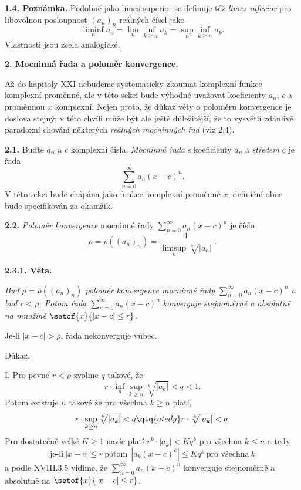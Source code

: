 \documentclass[12pt]{article}
\begin{document}
   \bigskip
   
   {\bf 1.4. Poznámka.} Podobně jako limes superior se definuje též
    {\em limes inferior}  pro libovolnou posloupnost $(a_n)_n$ reálných čísel jako
 $$
 \liminf_na_n= \lim_n\inf_{k\geq n}a_k=\sup_n\inf_{k\geq n}a_k.
 $$
Vlastnosti jsou zcela analogické.
 
 
 
 
 
   
   \vskip10mm
 
 {\large\bf 2. Mocninná řada a poloměr konvergence.}
 
 \bigskip
 
 Až do kapitoly XXI nebudeme systematicky zkoumat komplexní funkce komplexní proměnné, ale v této sekci bude výhodné uvažovat koeficienty
$a_n$, $c$  a proměnnou $x$ komplexní. Nejen proto, že důkaz věty o poloměru konvergence
je doslova stejný; v této chvíli může být ale ještě důležitější, že to vysvětlí zdánlivě paradoxní chování některých {\em reálných mocninných řad} (viz 2.4).
  
  \bigskip
 
 {\bf 2.1.} Buďte $a_n$ a $c$ komplexní čísla.  {\em Mocninná řada} s koeficienty $a_n$ a {\em středem} $c$ je řada
 $$
 \sum_{n=0}^\infty a_n(x-c)^n.
 $$
V této sekci bude chápána jako funkce komplexní proměnné $x$; definiční obor bude specifikován za okamžik.
 
 \bigskip
 
 {\bf 2.2.}  {\em Poloměr konvergence} mocninné řady $\sum_{n=0}^\infty a_n(x-c)^n$ je číslo
 $$
 \rho=\rho((a_n)_n)=\frac{1}{\limsup_n\sqrt[n]{|a_n|}}\ .
 $$
 
   \medskip
   
   {\bf 2.3.1. Věta.} {\em  Buď $\rho=\rho((a_n)_n)$ poloměr konvergence mocninné řady
	$\sum_{n=0}^\infty a_n(x-c)^n$ a buď $r<\rho$. Potom řada $\sum_{n=0}^\infty a_n(x-c)^n$ konverguje stejnoměrně a absolutně na množině
   $\setof{x}{|x-c|\leq r}$. 
   
   Je-li $|x-c|>\rho$, řada nekonverguje vůbec.
   
   Důkaz.} I. Pro pevné    $r<\rho$ zvolme $q$ takové, že
   $$
   r\cdot\inf_n \sup_{k\geq n}\sqrt[k]{|a_k|}<q<1.
   $$
   Potom existuje $n$ takové že pro všechna $k\geq n$ platí,
   $$
   r\cdot \sup_{k\geq n}\sqrt[k]{|a_k|}<q \qtq{a tedy} r\cdot\sqrt[k]{|a_k|}< q.
   $$
  Pro dostatečně velké $K\geq 1$ navíc platí $r^k\cdot|a_k|<Kq^k$ pro všechna $k\leq n$ a tedy
   $$
   \text{je-li}\ |x-c|\leq r\ \text{potom} \ \ |a_k(x-c)^k|\leq Kq^k\ \text{pro všechna}\ k
   $$
   a podle XVIII.3.5 vidíme, že
  $\sum_{n=0}^\infty a_n(x-c)^n$ konverguje stejnoměrně a absolutně na $\setof{x}{|x-c|\leq r}$.
  
\end{document}
